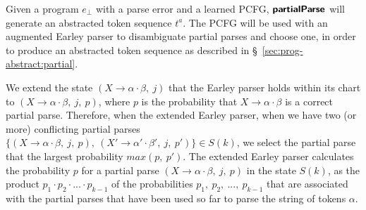 Given a program $e_{\bot}$ with a parse error and a learned PCFG, $\bm{\mathsf{partialParse}}$
will generate an abstracted token sequence $t^a$. The PCFG will be used with an
augmented Earley parser to disambiguate partial parses and choose one, in order
to produce an abstracted token sequence as described in
\S~\ref{sec:prog-abstract:partial}.

We extend the state $(X \rightarrow \alpha \cdot \beta,\ j)$ that the Earley
parser holds within its chart to $(X \rightarrow \alpha \cdot \beta,\ j,\ p)$,
where $p$ is the probability that $X \rightarrow \alpha \cdot \beta$ is a
correct partial parse. Therefore, when the extended Earley parser, when we have
two (or more) conflicting partial parses $\{(X \rightarrow \alpha \cdot \beta,\
j,\ p),\ (X' \rightarrow \alpha' \cdot \beta',\ j,\ p')\} \in S(k)$, we select
the partial parse that the largest probability $max(p,\ p')$. The extended
Earley parser calculates the probability $p$ for a partial parse $(X \rightarrow
\alpha \cdot \beta,\ j,\ p)$ in the state $S(k)$, as the product $p_1 \cdot p_2
\cdot ... \cdot p_{k-1}$ of the probabilities $p_1,\ p_2,\ ...,\ p_{k-1}$ that
are associated with the partial parses that have been used so far to parse the
string of tokens $\alpha$.





